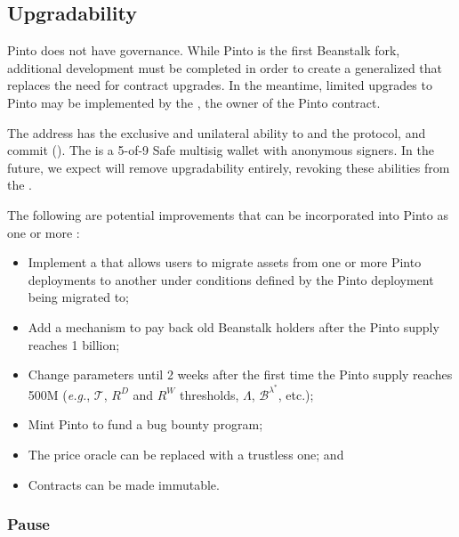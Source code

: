 \documentclass[class=article, crop=false]{standalone}
\begin{document}

\subsection{Upgradability}

Pinto does not have governance. While Pinto is the first Beanstalk fork, additional development must be completed in order to create a generalized  that replaces the need for contract upgrades. In the meantime, limited upgrades to Pinto may be implemented by the , the owner of the Pinto contract.

The  address has the exclusive and unilateral ability to  and  the protocol, and commit  (). The  is a 5-of-9 Safe multisig wallet with anonymous signers. In the future, we expect  will remove upgradability entirely, revoking these abilities from the .

The following are potential improvements that can be incorporated into Pinto as one or more :

\begin{itemize}
    \item Implement a  that allows users to migrate assets from one or more Pinto deployments to another under conditions defined by the Pinto deployment being migrated to;
    \item Add a mechanism to pay back old Beanstalk holders after the Pinto supply reaches 1 billion;
    \item Change parameters until 2 weeks after the first time the Pinto supply reaches 500M (\textit{e.g.}, $\mathscr{T}$, $R^D$ and $R^W$ thresholds, $\Lambda$, $\mathscr{B}^{\lambda^*}$, etc.);
    \item Mint Pinto to fund a bug bounty program;
    \item The price oracle can be replaced with a trustless one; and
    \item Contracts can be made immutable.
\end{itemize}


\subsubsection{Pause}
\end{document}
